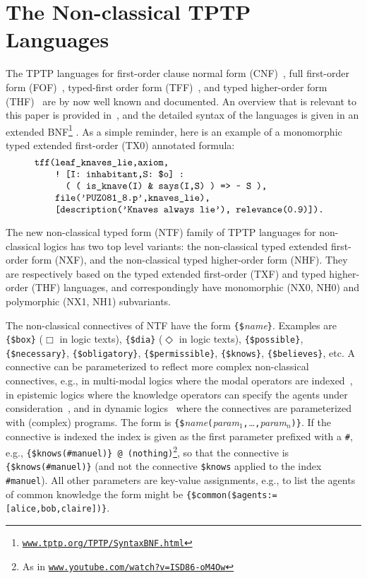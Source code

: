 \documentclass{ceurart}
\begin{document}
\section{The Non-classical TPTP Languages}
\label{TPTPLanguages}

The TPTP languages for first-order clause normal form (CNF)~\cite{SS98-JAR}, full first-order 
form (FOF)~\cite{Sut09}, typed-first order form (TFF)~\cite{SS+12,BP13-TFF1}, and typed 
higher-order form (THF)~\cite{SB10,KSR16} are by now well known and documented.
An overview that is relevant to this paper is provided in~\cite{SF+22}, and the detailed
syntax of the languages is given in an extended BNF\footnote{%
\label{BNF}\href{https://www.tptp.org/TPTP/SyntaxBNF.html}{\tt www.tptp.org/TPTP/SyntaxBNF.html}} 
\cite{VS06}.
As a simple reminder, here is an example of a monomorphic typed extended first-order (TX0) 
annotated formula:
\[
\begin{minipage}{\textwidth}
\begin{verbatim}
    tff(leaf_knaves_lie,axiom,
        ! [I: inhabitant,S: $o] : 
          ( ( is_knave(I) & says(I,S) ) => ~ S ),
        file('PUZ081_8.p',knaves_lie),
        [description('Knaves always lie'), relevance(0.9)]).
\end{verbatim}
\end{minipage}
\]

The new non-classical typed form (NTF) family of TPTP languages for non-classical logics has two 
top level variants: the non-classical typed extended first-order form (NXF), and the non-classical 
typed higher-order form (NHF).
They are respectively based on the typed extended first-order (TXF) and typed higher-order (THF)
languages, and correspondingly have mono\-morphic (NX0, NH0) and polymorphic (NX1, NH1) 
subvariants.

The non-classical connectives of NTF have the form {\tt \{\$}{\em name}{\tt \}}.
Examples are {\tt \{\$box\}} ($\Box$ in logic texts), {\tt \{\$dia\}} ($\Diamond$ in logic texts), 
{\tt \{\$possible\}}, {\tt \{\$necessary\}}, {\tt \{\$obligatory\}}, {\tt \{\$permissible\}}, 
{\tt \{\$knows\}}, {\tt \{\$believes\}}, etc.
A connective can be parameterized to reflect more complex non-classical connectives, e.g., in 
multi-modal logics where the modal operators are indexed~\cite{Bal98}, in epistemic logics where 
the knowledge operators can specify the agents under consideration~\cite{vDH15}, and in dynamic 
logics~\cite{HKT00} where the connectives are parameterized with (complex) programs.
The form is
{\tt \{\$}{\em name}{\tt (}{\em param$_1$}{\tt ,}{\em \ldots}{\tt ,}{\em param$_n$}{\tt )}{\tt \}}.
If the connective is indexed the index is given as the first parameter prefixed with a {\tt \#},
e.g., {\tt \{\$knows(\#manuel)\}\,@\,(nothing)}\footnote{%
As in \href{https://www.youtube.com/watch?v=ISD86-oM4Ow}{\tt www.youtube.com/watch?v=ISD86-oM4Ow}},
so that the connective is {\tt \{\$knows(\#manuel)\}} (and not the connective {\tt \$knows} applied
to the index {\tt \#manuel}).
All other parameters are key-value assignments, e.g., to list the agents of common knowledge the
form might be {\tt \{\$common(\$agents:=[alice,bob,claire])\}}.
\end{document}

